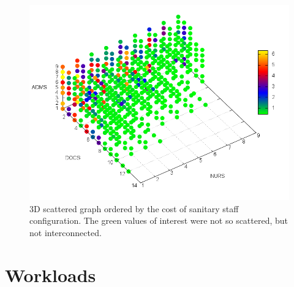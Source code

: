 \begin{figure}[h]
\noindent \begin{centering}
\includegraphics[width=0.88\columnwidth,height=0.2\paperheight]{figs4/3D-scatter-LoS-$2}
\par\end{centering}

\caption{3D scattered graph ordered by the cost of sanitary staff configuration.
The green values of interest were not so scattered, but not interconnected.\label{fig:3D-scattered-LoS-cost} }


\end{figure}



\section{Workloads}

